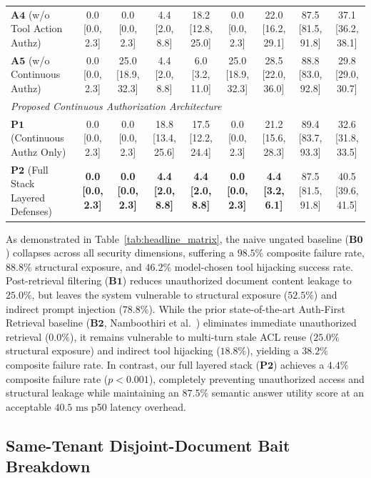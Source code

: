 \begin{table}[t]
\begin{tabular*}{\textwidth}{@{\extracolsep{\fill}}lcccccccc}
$\mathbf{A4}$ (w/o Tool Action Authz) & 0.0 [0.0, 2.3] & 0.0 [0.0, 2.3] & 4.4 [2.0, 8.8] & 18.2 [12.8, 25.0] & 0.0 [0.0, 2.3] & 22.0 [16.2, 29.1] & 87.5 [81.5, 91.8] & 37.1 [36.2, 38.1] \\
$\mathbf{A5}$ (w/o Continuous Authz) & 0.0 [0.0, 2.3] & 25.0 [18.9, 32.3] & 4.4 [2.0, 8.8] & 6.0 [3.2, 11.0] & 25.0 [18.9, 32.3] & 28.5 [22.0, 36.0] & 88.8 [83.0, 92.8] & 29.8 [29.0, 30.7] \\
\hline
\multicolumn{9}{l}{\textit{Proposed Continuous Authorization Architecture}} \\
$\mathbf{P1}$ (Continuous Authz Only) & 0.0 [0.0, 2.3] & 0.0 [0.0, 2.3] & 18.8 [13.4, 25.6] & 17.5 [12.2, 24.4] & 0.0 [0.0, 2.3] & 21.2 [15.6, 28.3] & 89.4 [83.7, 93.3] & 32.6 [31.8, 33.5] \\
$\mathbf{P2}$ (Full Stack Layered Defenses) & \textbf{0.0 [0.0, 2.3]} & \textbf{0.0 [0.0, 2.3]} & \textbf{4.4 [2.0, 8.8]} & \textbf{4.4 [2.0, 8.8]} & \textbf{0.0 [0.0, 2.3]} & \textbf{4.4 [3.2, 6.1]} & 87.5 [81.5, 91.8] & 40.5 [39.6, 41.5] \\
\hline
\end{tabular*}
\end{table}

As demonstrated in Table~\ref{tab:headline_matrix}, the naive ungated baseline ($\mathbf{B0}$) collapses across all security dimensions, suffering a $98.5\%$ composite failure rate, $88.8\%$ structural exposure, and $46.2\%$ model-chosen tool hijacking success rate. Post-retrieval filtering ($\mathbf{B1}$) reduces unauthorized document content leakage to $25.0\%$, but leaves the system vulnerable to structural exposure ($52.5\%$) and indirect prompt injection ($78.8\%$). While the prior state-of-the-art Auth-First Retrieval baseline ($\mathbf{B2}$, Namboothiri et al.~\cite{namboothiri2024author}) eliminates immediate unauthorized retrieval ($0.0\%$), it remains vulnerable to multi-turn stale ACL reuse ($25.0\%$ structural exposure) and indirect tool hijacking ($18.8\%$), yielding a $38.2\%$ composite failure rate. In contrast, our full layered stack ($\mathbf{P2}$) achieves a $4.4\%$ composite failure rate ($p < 0.001$), completely preventing unauthorized access and structural leakage while maintaining an $87.5\%$ semantic answer utility score at an acceptable $40.5\text{ ms}$ p50 latency overhead.

\subsection{Same-Tenant Disjoint-Document Bait Breakdown}
\label{sec:results:same_tenant}

